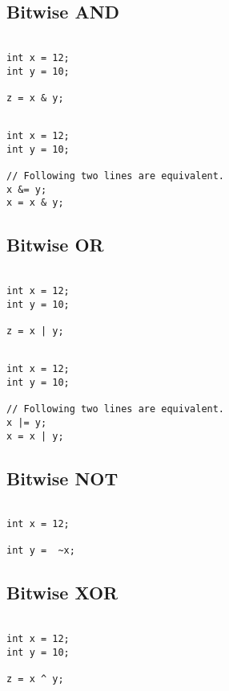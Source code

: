 
\subsection{Bitwise AND}

\begin{verbatim}

int x = 12;
int y = 10;

z = x & y;

\end{verbatim}

\begin{verbatim}

int x = 12;
int y = 10;

// Following two lines are equivalent.
x &= y;
x = x & y;

\end{verbatim}


\subsection{Bitwise OR}

\begin{verbatim}

int x = 12;
int y = 10;

z = x | y;

\end{verbatim}

\begin{verbatim}

int x = 12;
int y = 10;

// Following two lines are equivalent.
x |= y;
x = x | y;

\end{verbatim}

\subsection{Bitwise NOT}

\begin{verbatim}

int x = 12;

int y =  ~x;

\end{verbatim}

\subsection{Bitwise XOR}

\begin{verbatim}

int x = 12;
int y = 10;

z = x ^ y;

\end{verbatim}

